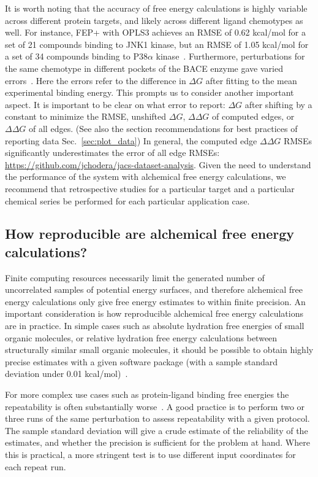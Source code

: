 \documentclass[9pt,bestpractices]{livecoms}
\begin{document}
It is worth noting that the accuracy of free energy calculations is highly variable across different protein targets, and likely across different ligand chemotypes as well.
For instance, FEP+ with OPLS3 achieves an RMSE of 0.62 kcal/mol for a set of 21 compounds binding to JNK1 kinase, but an RMSE of 1.05 kcal/mol for a set of 34 compounds binding to P38$\alpha$ kinase~\cite{harder2016opls3}.
Furthermore, perturbations for the same chemotype in different pockets of the BACE enzyme gave varied errors~\cite{keranen2017acylguanidine}. Here the errors refer to the difference in $\Delta G$ after fitting to the mean experimental binding energy. This prompts us to consider another important aspect. It is important to be clear on what error to report: $\Delta G$ after shifting by a constant to minimize the RMSE, unshifted $\Delta G$, $\Delta \Delta G$ of computed edges, or $\Delta \Delta G$ of all edges. (See also the section recommendations for best practices of reporting data Sec.~\ref{sec:plot_data}) In general, the computed edge $\Delta \Delta G$ RMSEs significantly underestimates the error of all edge RMSEs: \url{https://github.com/jchodera/jacs-dataset-analysis}. Given the need to understand the performance of the system with alchemical free energy calculations, we recommend that retrospective studies for a particular target and a particular chemical series be performed for each particular application case.

\subsection{How reproducible are alchemical free energy calculations?}
\label{subsec:reproducible}
Finite computing resources necessarily limit the generated number of uncorrelated samples of potential energy surfaces, and therefore alchemical free energy calculations only give free energy estimates to within finite precision. An important consideration is how reproducible alchemical free energy calculations are in practice. In simple cases such as absolute hydration free energies of small organic molecules, or relative hydration free energy calculations between structurally similar small organic molecules, it should be possible to obtain highly precise estimates with a given software package (with a sample standard deviation under 0.01 kcal/mol)~\cite{rizzi2019sampl6}.

For more complex use cases such as protein-ligand binding free energies the repeatability is often substantially worse~\cite{rizzi2019sampl6}. A good practice is to perform two or three runs of the same perturbation to assess repeatability with a given protocol. The sample standard deviation will give a crude estimate of the reliability of the estimates, and whether the precision is sufficient for the problem at hand. Where this is practical, a more stringent test is to use different input coordinates for each repeat run. 
\end{document}
